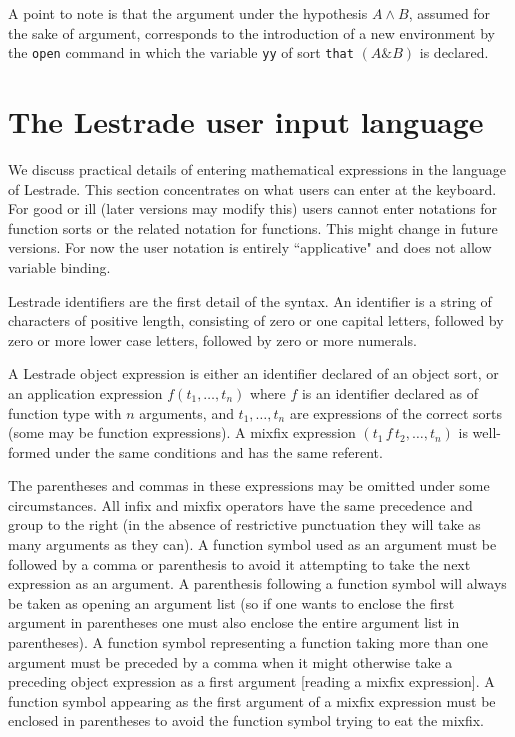 \documentclass[12pt]{article}
\begin{document}
A point to note is that the argument under the hypothesis $A \wedge B$, assumed for the sake of argument, corresponds to the introduction of a new environment by the {\tt open} command in which the variable {\tt yy} of sort {\tt that} $(A \& B)$ is declared.

\section{The Lestrade user input language}

We discuss practical details of entering mathematical expressions in the language of Lestrade.  This section concentrates on what users can enter at the keyboard.  For good or ill (later versions may modify this) users cannot enter notations for function sorts or the related notation for functions.  This might change in future versions.  For now the user notation is entirely ``applicative" and does not allow variable binding.

Lestrade identifiers are the first detail of the syntax.  An identifier is a string of characters of positive length, consisting of zero or one capital letters,
followed by zero or more lower case letters, followed by zero or more numerals.

A Lestrade object expression is either an identifier declared of an object sort, or an application expression $f(t_1,\ldots,t_n)$  where $f$ is
an identifier declared as of function type with $n$ arguments, and $t_1,\ldots,t_n$ are expressions of the correct sorts (some may be function expressions).
A mixfix expression $(t_1 \,f \,t_2, \ldots, t_n)$ is well-formed under the same conditions and has the same referent.  

The parentheses and commas in these expressions may be omitted under some circumstances.  All infix and mixfix operators have the same precedence and group to the right (in the absence of restrictive punctuation they will take as many arguments as they can).  A function symbol used as an argument must be followed by a comma or parenthesis to avoid it attempting to take the next expression as an argument.  A parenthesis following a function symbol will always be taken as opening an argument list (so if one wants to enclose the first argument in parentheses one must also enclose the entire argument list in parentheses).  A function symbol representing a function taking more than one argument
must be preceded by a comma when it might otherwise take a preceding object expression as a first argument [reading a mixfix expression].  A function symbol appearing as the first argument of a mixfix expression must be enclosed in parentheses to avoid the function symbol trying to eat the mixfix.
\end{document}
